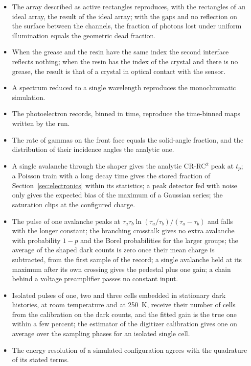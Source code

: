 \documentclass[11pt]{article}
\begin{document}
\begin{itemize}
\item The array described as active rectangles reproduces, with the
  rectangles of an ideal array, the result of the ideal array; with the
  gaps and no reflection on the surface between the channels, the fraction
  of photons lost under uniform illumination equals the geometric dead
  fraction.
\item When the grease and the resin have the same index the second
  interface reflects nothing; when the resin has the index of the crystal
  and there is no grease, the result is that of a crystal in optical contact
  with the sensor.
\item A spectrum reduced to a single wavelength reproduces the monochromatic
  simulation.
\item The photoelectron records, binned in time, reproduce the time-binned
  maps written by the run.
\item The rate of gammas on the front face equals the solid-angle fraction,
  and the distribution of their incidence angles the analytic one.
\item A single avalanche through the shaper gives the analytic CR-RC$^2$ peak
  at $t_p$; a Poisson train with a long decay time gives the stored fraction
  of Section~\ref{sec:electronics} within its statistics; a peak detector
  fed with noise only gives the expected bias of the maximum of a Gaussian
  series; the saturation clips at the configured charge.
\item The pulse of one avalanche peaks at $\tau_a\tau_b\ln(\tau_a/\tau_b)/
  (\tau_a-\tau_b)$ and falls with the longer constant; the branching
  crosstalk gives no extra avalanche with probability $1-p$ and the Borel
  probabilities for the larger groups; the average of the shaped dark
  counts is zero once their mean charge is subtracted, from the first
  sample of the record; a single avalanche held at its maximum after its
  own crossing gives the pedestal plus one gain; a chain behind a voltage
  preamplifier passes no constant input.
\item Isolated pulses of one, two and three cells embedded in stationary
  dark histories, at room temperature and at 250~K, receive their number
  of cells from the calibration on the dark counts, and the fitted gain
  is the true one within a few percent; the estimator of the digitizer
  calibration gives one on average over the sampling phases for an
  isolated single cell.
\item The energy resolution of a simulated configuration agrees with the
  quadrature of its stated terms.
\end{itemize}
\end{document}
